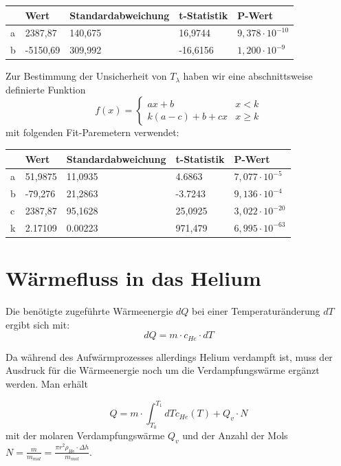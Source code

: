 \documentclass[bigchapter,colorback,accentcolor=tud4b,linedtoc,11pt]{tudreport}
\begin{document}
\begin{center}
  \begin{tabular}{l|llll}
      & Wert     & Standardabweichung & t-Statistik & P-Wert                 \\ \hline
    a & 2387,87  & 140,675            & 16,9744     & $9,378 \cdot 10^{-10}$ \\
    b & -5150,69 & 309,992            & -16,6156    & $1,200 \cdot 10^{-9}$  \\
  \end{tabular}
\end{center}

\color{blue}
Zur Bestimmung der Unsicherheit von $T_{\lambda}$ haben wir eine abschnittsweise
definierte Funktion 
$$
f(x) = \begin{cases}
 a x+b         & x<k                                                                 \\
 k (a-c)+b+c x & x\geq k
\end{cases}
$$
mit folgenden Fit-Paremetern verwendet:
\begin{center}
  \begin{tabular}{l|llll}
               & Wert    & Standardabweichung & t-Statistik & P-Wert                 \\ \hline
    a          & 51,9875 & 11,0935            & 4.6863      & $7,077 \cdot 10^{-5}$  \\
    b          & -79,276 & 21,2863            & -3.7243     & $9,136 \cdot 10^{-4}$  \\
    c          & 2387,87 & 95,1628            & 25,0925     & $3,022 \cdot 10^{-20}$ \\
    k          & 2.17109 & 0.00223            & 971,479     & $6,995 \cdot 10^{-63}$ \\
  \end{tabular}
\end{center}

\color{black}
\section{Wärmefluss in das Helium}
Die benötigte zugeführte Wärmeenergie $dQ$ bei einer Temperaturänderung $dT$
ergibt sich mit:
$$dQ = m \cdot c_{He} \cdot dT$$

Da während des Aufwärmprozesses allerdings Helium verdampft ist, muss der
Ausdruck für die Wärmeenergie noch um die Verdampfungswärme ergänzt werden. Man
erhält

$$Q = m \cdot \int_{T_0}^{T_1}dT c_{He}(T) + Q_v \cdot N$$
mit der molaren Verdampfungswärme $Q_v$ und der Anzahl der Mols $N =
\frac{m}{m_{mol}} = \frac{\pi r^2 \rho_{He}\cdot \Delta h}{m_{mol}}$.
\end{document}
